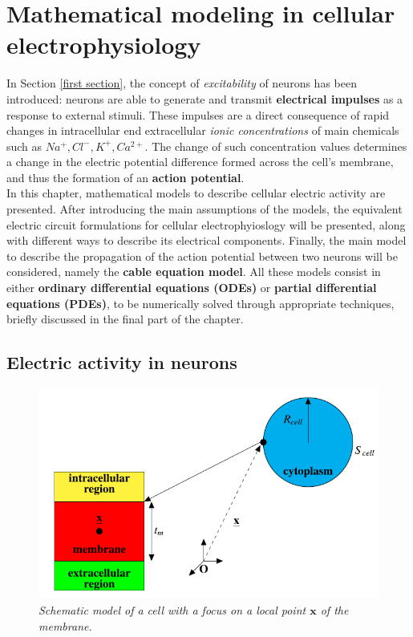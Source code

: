 \documentclass[12pt, a4paper]{report}
\begin{document}
\newpage

\chapter{Mathematical modeling in cellular electrophysiology}

In Section \ref{first section}, the concept of \textit{excitability} of neurons has been introduced: neurons are able to generate and transmit \textbf{electrical impulses} as a response to external stimuli. These impulses are a direct consequence of rapid changes in intracellular end extracellular \textit{ionic concentrations} of main chemicals such as $Na^+, Cl^-, K^+, Ca^{2+}$. The change of such concentration values determines a change in the electric potential difference formed across the cell's membrane, and thus the formation of an \textbf{action potential}. \\
In this chapter, mathematical models to describe cellular electric activity are presented. After introducing the main assumptions of the models, the equivalent electric circuit formulations for cellular electrophyioslogy will be presented, along with different ways to describe its electrical components. Finally, the main model to describe the propagation of the action potential between two neurons will be considered, namely the \textbf{cable equation model}. All these models consist in either \textbf{ordinary differential equations (ODEs)} or \textbf{partial differential equations (PDEs)}, to be numerically solved through appropriate techniques, briefly discussed in the final part of the chapter.

\section{Electric activity in neurons}


\begin{figure}[H]
	\begin{center}
		\includegraphics[scale=0.7]{first.png} 
	\end{center} 
	\caption{\textit{Schematic model of a cell with a focus on a local point $\textbf{x}$ of the membrane.}}
	\label{first}
\end{figure}
\end{document}
